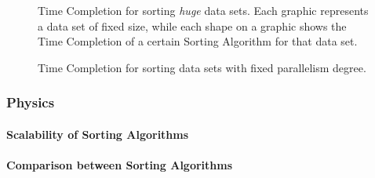 \begin{figure}[!ht]
	\caption{Time Completion for sorting \textit{huge} data sets. Each graphic represents a data set of fixed size, while each shape on a graphic shows the Time Completion of a certain Sorting Algorithm for that data set.}
	\label{NxTxA-huge}
\end{figure} 

\begin{figure}[!ht]
	\centering
	\hspace*{20pt}	
  		
	\centering
  	\hspace*{20pt}
  	
	\caption{Time Completion for sorting data sets with fixed parallelism degree.}
	\label{MxTxA}
\end{figure} 

\clearpage

\subsubsection{Physics}

\paragraph{Scalability of Sorting Algorithms}
\paragraph{Comparison between Sorting Algorithms}
